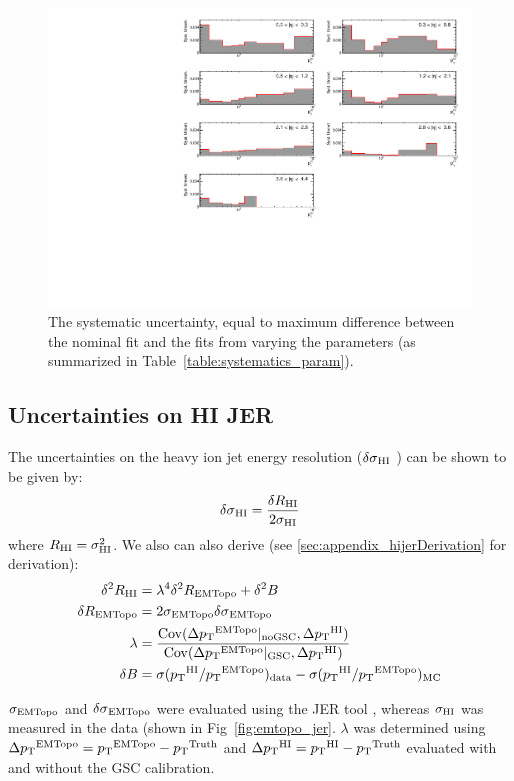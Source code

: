 \begin{figure}
	\centering
	\includegraphics[width=1.0\textwidth]{figures/qualification/sys_uncert}
	\caption{The systematic uncertainty, equal to maximum difference between the nominal fit and the fits from varying the parameters (as summarized in Table~\ref{table:systematics_param}).  }
	\label{fig:sys_uncert}%
\end{figure}


\subsection{Uncertainties on HI JER}
\label{sec:qual_jeruncertainties}
The uncertainties on the heavy ion jet energy resolution ($\mbox{$\delta \sigma$}_{\mathrm{HI}}$ ) can be shown to be given by: 
\begin{align}
\mbox{$\delta \sigma$}_{\mathrm{HI}} = \frac{\delta R_{\mathrm{HI}}}{2 \sigma_{\mathrm{HI}}}
\end{align} 
where $R_{\mathrm{HI}} = \sigma_{\mathrm{HI}}^2$. We also can also derive (see \ref{sec:appendix_hijerDerivation} for derivation):
\begin{align}
\delta^2 R_{\mathrm{HI}} &= \lambda^4 \delta^2 R_{\text{EMTopo}} + \delta^2 B \\
\delta R_{\text{EMTopo}}  &= 2 \sigma_{\text{EMTopo}} \mbox{$\delta \sigma$}_{\text{EMTopo}} \\
\lambda &= \frac{\mathrm{Cov}(\Delta \mbox{$p_{\mathrm{T}}$}^{\text{EMTopo}} | _\mathrm{noGSC}, \Delta \mbox{$p_{\mathrm{T}}$}^{\mathrm{HI}})}{\mathrm{Cov}(\Delta \mbox{$p_{\mathrm{T}}$}^{\text{EMTopo}} | _\mathrm{GSC}, \Delta \mbox{$p_{\mathrm{T}}$}^{\mathrm{HI}})} \label{eq:lambda} \\ 
\delta B &= \sigma(\mbox{$p_{\mathrm{T}}$}^{\mathrm{HI}}/\mbox{$p_{\mathrm{T}}$}^{\text{EMTopo}})_\mathrm{data} - \sigma(\mbox{$p_{\mathrm{T}}$}^{\mathrm{HI}}/\mbox{$p_{\mathrm{T}}$}^{\text{EMTopo}})_\mathrm{MC} 
\end{align} 

$\sigma_{\text{EMTopo}}$ and $\mbox{$\delta \sigma$}_{\text{EMTopo}}$ were evaluated using the JER tool \cite{JERTool}, whereas $\sigma_{\mathrm{HI}}$ was measured in the data (shown in Fig~\ref{fig:emtopo_jer}. $\lambda$ was determined using $\Delta\mbox{$p_{\mathrm{T}}$}^{\text{EMTopo}} = \mbox{$p_{\mathrm{T}}$}^{\text{EMTopo}} - \mbox{$p_{\mathrm{T}}$}^{\mathrm{Truth}}$ and $\Delta\mbox{$p_{\mathrm{T}}$}^{\mathrm{HI}} =\mbox{$p_{\mathrm{T}}$}^{\mathrm{HI}} - \mbox{$p_{\mathrm{T}}$}^{\mathrm{Truth}}$ evaluated with and without the GSC calibration. 

